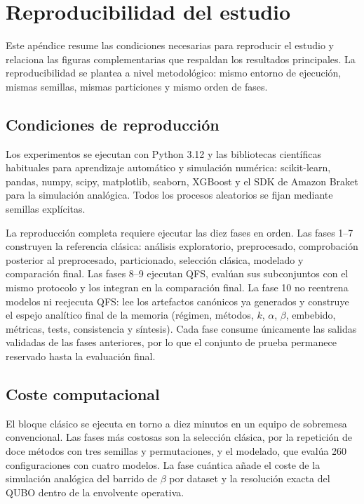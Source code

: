 \section{Reproducibilidad del estudio}
\label{cap:apendice}

Este apéndice resume las condiciones necesarias para reproducir el
estudio y relaciona las figuras complementarias que respaldan los
resultados principales. La reproducibilidad se plantea a nivel
metodológico: mismo entorno de ejecución, mismas semillas, mismas
particiones y mismo orden de fases.

\subsection{Condiciones de reproducción}

Los experimentos se ejecutan con Python 3.12 y las bibliotecas
científicas habituales para aprendizaje automático y simulación
numérica: scikit-learn, pandas, numpy, scipy, matplotlib, seaborn,
XGBoost y el SDK de Amazon Braket para la simulación analógica. Todos
los procesos aleatorios se fijan mediante semillas explícitas.

La reproducción completa requiere ejecutar las diez fases en orden. Las
fases 1--7 construyen la referencia clásica: análisis exploratorio,
preprocesado, comprobación posterior al preprocesado, particionado, selección
clásica, modelado y comparación final. Las fases 8--9 ejecutan QFS,
evalúan sus subconjuntos con el mismo protocolo y los integran en la
comparación final. La fase 10 no reentrena modelos ni reejecuta QFS:
lee los artefactos canónicos ya generados y construye el espejo
analítico final de la memoria (régimen, métodos, $k$, $\alpha$, $\beta$,
embebido, métricas, tests, consistencia y síntesis). Cada fase consume
únicamente las salidas validadas de las fases anteriores, por lo que el
conjunto de prueba permanece reservado hasta la evaluación final.

\subsection{Coste computacional}

El bloque clásico se ejecuta en torno a diez minutos en un equipo de
sobremesa convencional. Las fases más costosas son la selección clásica,
por la repetición de doce métodos con tres semillas y permutaciones, y
el modelado, que evalúa 260 configuraciones con cuatro modelos. La fase
cuántica añade el coste de la simulación analógica del barrido de
$\beta$ por dataset y la resolución exacta del QUBO dentro de la
envolvente operativa.

